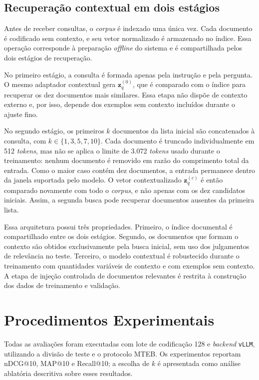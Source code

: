 \subsection{Recuperação contextual em dois estágios}
\label{subsec:ctx-emb-dois-estagios}

Antes de receber consultas, o \textit{corpus} é indexado uma única vez. Cada documento é codificado sem contexto, e seu vetor normalizado é armazenado no índice. Essa operação corresponde à preparação \textit{offline} do sistema e é compartilhada pelos dois estágios de recuperação.

No primeiro estágio, a consulta é formada apenas pela instrução e pela pergunta. O mesmo adaptador contextual gera $\mathbf{z}^{(0)}_q$, que é comparado com o índice para recuperar os dez documentos mais similares. Essa etapa não dispõe de contexto externo e, por isso, depende dos exemplos sem contexto incluídos durante o ajuste fino.

No segundo estágio, os primeiros $k$ documentos da lista inicial são concatenados à consulta, com $k\in\{1,3,5,7,10\}$. Cada documento é truncado individualmente em 512 \textit{tokens}, mas não se aplica o limite de 3.072 \textit{tokens} usado durante o treinamento: nenhum documento é removido em razão do comprimento total da entrada. Como o maior caso contém dez documentos, a entrada permanece dentro da janela suportada pelo modelo. O vetor contextualizado $\mathbf{z}^{(c)}_q$ é então comparado novamente com todo o \textit{corpus}, e não apenas com os dez candidatos iniciais. Assim, a segunda busca pode recuperar documentos ausentes da primeira lista.

Essa arquitetura possui três propriedades. Primeiro, o índice documental é compartilhado entre os dois estágios. Segundo, os documentos que formam o contexto são obtidos exclusivamente pela busca inicial, sem uso dos julgamentos de relevância no teste. Terceiro, o modelo contextual é robustecido durante o treinamento com quantidades variáveis de contexto e com exemplos sem contexto. A etapa de injeção controlada de documentos relevantes é restrita à construção dos dados de treinamento e validação.

\section{Procedimentos Experimentais}
\label{sec:ctx-emb-procedimentos}

Todas as avaliações foram executadas com lote de codificação 128 e \textit{backend} \texttt{vLLM}, utilizando a divisão de teste e o protocolo MTEB. Os experimentos reportam nDCG@10, MAP@10 e Recall@10; a escolha de $k$ é apresentada como análise ablatória descritiva sobre esses resultados.

